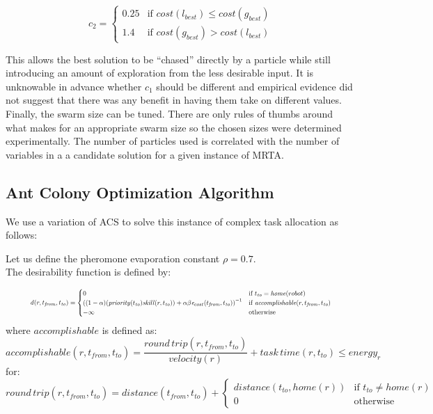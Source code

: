 \documentclass[a4paper]{article}
\begin{document}
$$
c_2 =
\begin{cases}
0.25 & \text{if } \mathit{cost}(l_\mathit{best}) \leq \mathit{cost}(g_\mathit{best})\\
1.4 & \text{if } \mathit{cost}(g_\mathit{best}) > \mathit{cost}(l_\mathit{best})
\end{cases}
$$

This allows the best solution to be ``chased'' directly by a particle while still introducing an amount of exploration from the less desirable input. It is unknowable in advance whether $c_1$ should be different and empirical evidence did not suggest that there was any benefit in having them take on different values. \cite{PermutationPSO}\\

Finally, the swarm size can be tuned. There are only rules of thumbs around what makes for an appropriate swarm size so the chosen sizes were determined experimentally. The number of particles used is correlated with the number of variables in a a candidate solution for a given instance of MRTA. \cite{PermutationPSO}

\subsection{Ant Colony Optimization Algorithm} %

We use a variation of ACS to solve this instance of complex task allocation as follows:

Let us define the pheromone evaporation constant $\rho=0.7$.\\
The desirability function is defined by:

\begin{equation*}
\resizebox{0.9\textwidth}{!}{$
\mathit{d}(r, t_\mathit{from}, t_\mathit{to}) = \begin{cases}
  0 & \text{if } t_\mathit{to} = \mathit{home}(robot) \\
  \left(
  (1 - \alpha)
    (\mathit{priority}(t_\mathit{to}) \mathit{skill}(r, t_\mathit{to})) +
    \alpha \beta
    \mathit{e}_{cost}(t_\mathit{from}, t_\mathit{to})
  \right)^{-1}
  & \text{if }\mathit{accomplishable}(r, t_\mathit{from}, t_\mathit{to}) \\
  - \infty
  & \text{otherwise} \\
\end{cases}
$}
\end{equation*}
where $\mathit{accomplishable}$ is defined as:
$$
\mathit{accomplishable}(r, t_\mathit{from}, t_\mathit{to}) =
\frac{\mathit{round\,trip}(r, t_\mathit{from}, t_\mathit{to})}{velocity(r)} + \mathit{task \, time}(r, t_\mathit{to}) \leq \mathit{energy}_r
$$
for:
$$
\mathit{round\,trip}(r, t_\mathit{from}, t_\mathit{to}) = \mathit{distance}(t_\mathit{from}, t_\mathit{to}) + \begin{cases}
\mathit{distance}(t_\mathit{to}, \mathit{home}(r)) & \text{if } t_\mathit{to} \ne \mathit{home}(r) \\
0 & \text{otherwise}
\end{cases}
$$
\end{document}
